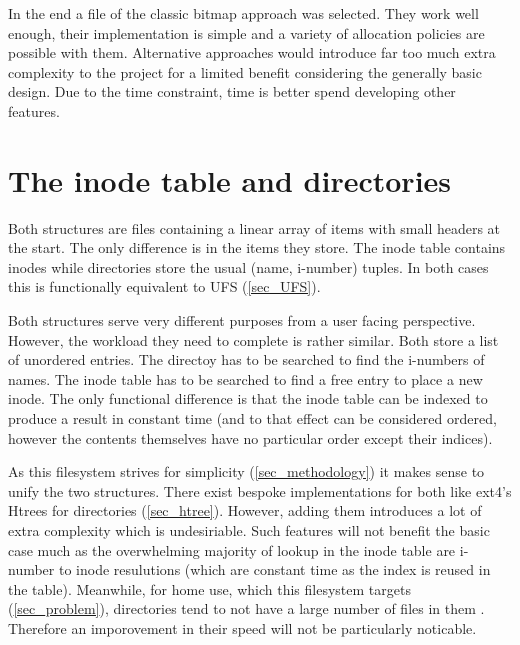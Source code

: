         In the end a file of the classic bitmap approach was selected. They
        work well enough, their implementation is simple and a variety of
        allocation policies are possible with them. Alternative approaches
        would introduce far too much extra complexity to the project for a
        limited benefit considering the generally basic design. Due to the time
        constraint, time is better spend developing other features.

    \section{The inode table and directories}

        Both structures are files containing a linear array of items with small
        headers at the start. The only difference is in the items they store.
        The inode table contains inodes while directories store the usual
        (name, i-number) tuples. In both cases this is functionally equivalent
        to UFS (\ref{sec_UFS}).

        Both structures serve very different purposes from a user facing
        perspective. However, the workload they need to complete is rather
        similar. Both store a list of unordered entries. The directoy has to be
        searched to find the i-numbers of names. The inode table has to be
        searched to find a free entry to place a new inode. The only functional
        difference is that the inode table can be indexed to produce a result
        in constant time (and to that effect can be considered ordered, however
        the contents themselves have no particular order except their indices).

        As this filesystem strives for simplicity (\ref{sec_methodology}) it
        makes sense to unify the two structures. There exist bespoke
        implementations for both like ext4's Htrees for directories
        (\ref{sec_htree}). However, adding them introduces a lot of extra
        complexity which is undesiriable. Such features will not benefit the
        basic case much as the overwhelming majority of lookup in the inode
        table are i-number to inode resulutions (which are constant time as the
        index is reused in the table). Meanwhile, for home use, which this
        filesystem targets (\ref{sec_problem}), directories tend to not have a
        large number of files in them \cite{contents_study}. Therefore an
        imporovement in their speed will not be particularly noticable.

